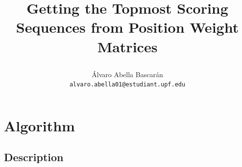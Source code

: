 \documentclass{article}
\begin{document}
\title{Getting the Topmost Scoring Sequences from Position Weight Matrices
     \author{\'{A}lvaro Abella Bascar\'{a}n\\
     \texttt{alvaro.abella01@estudiant.upf.edu}}
     }
\maketitle

\newpage

\section{Algorithm} \label{algorithm}
\subsection{Description}
\end{document}
